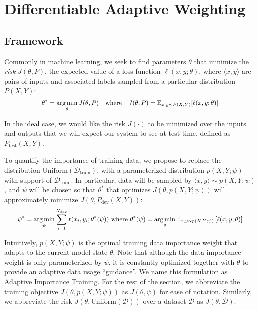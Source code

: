 \section{\label{sec:method} Differentiable Adaptive Weighting}
\subsection{\label{sec:dds_motivation}Framework}

Commonly in machine learning, we seek to find parameters $\theta$ that minimize the \emph{risk} $J(\theta,P)$, the expected value of a loss function $\ell(x, y; \theta)$, where $\langle x, y \rangle$ are pairs of inputs and associated labels sampled from a particular distribution $P(X, Y)$:
\begin{equation}
  \label{eqn:generic_optim}
   \small
  \begin{aligned}
    \theta^* = \argmin_\theta J(\theta, P)
    ~~~\text{where}~~~
    J(\theta, P) = \mathbb{E}_{x, y \sim P(X, Y)} [\ell(x, y; \theta)]
  \end{aligned}
\end{equation}

In the ideal case, we would like the risk $J(\cdot)$ to be minimized over the inputs and outputs that we will expect our system to see at test time, defined as $P_{\text{test}}(X,Y)$.

To quantify the importance of training data, we propose to replace the distribution $\text{Uniform}(\mathcal{D}_\text{train})$, with a parameterized distribution $p(X, Y; \psi)$ with support of $\mathcal{D}_\text{train}$. In particular, data will be sampled by $\langle x, y \rangle \sim p(X, Y; \psi)$, 
and $\psi$ will be chosen so that $\theta^*$ that optimizes $J(\theta, p(X, Y;\psi))$ will approximately minimize $J(\theta, P_\text{dev}(X,Y))$: 
\begin{equation}
  \label{eqn:psi_theta_argmin}
   \small
  \begin{aligned}
    \psi^* = \argmin_\psi
    \sum_{i=1}^{N_\text{dev}} \ell(x_i, y_i; \theta^*(\psi))
    ~\text{where}~
    \theta^*(\psi) = \argmin_\theta \mathbb{E}_{x, y \sim p(X, Y; \psi)} \left[ \ell(x, y; \theta) \right]
  \end{aligned}
\end{equation}

Intuitively, $p(X, Y;\psi)$ is the optimal training data importance weight that adapts to the current model state $\theta$. Note that although the data importance weight is only parameterized by $\psi$, it is constantly optimized together with $\theta$ to provide an adaptive data usage ``guidance''. We name this formulation as Adaptive Importance Training. For the rest of the section, we abbreviate the training objective $J(\theta, p(X, Y;\psi))$ as $J(\theta, \psi)$ for ease of notation. Similarly, we abbreviate the risk $J(\theta, \text{Uniform}(\mathcal{D}))$ over a dataset $\mathcal{D}$ as $J(\theta, \mathcal{D})$.

